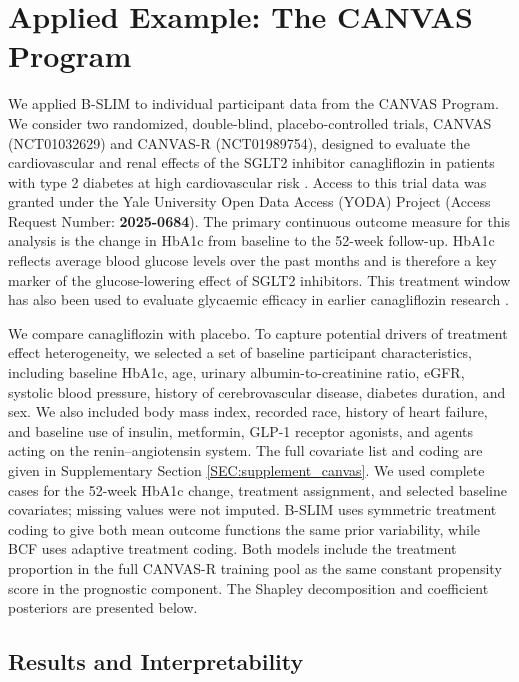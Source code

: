 \documentclass[12pt]{article}
\begin{document}
\section{Applied Example: The CANVAS Program}
\label{subsec:applied_example}
We applied B-SLIM to individual participant data from the CANVAS Program. We consider two randomized, double-blind, placebo-controlled trials, CANVAS (NCT01032629) and CANVAS-R (NCT01989754), designed to evaluate the cardiovascular and renal effects of the SGLT2 inhibitor canagliflozin in patients with type 2 diabetes at high cardiovascular risk \citep{neal2013rationale, neal2017rationale}. Access to this trial data was granted under the Yale University Open Data Access (YODA) Project (Access Request Number: \textbf{2025-0684}). The primary continuous outcome measure for this analysis is the change in HbA1c from baseline to the 52-week follow-up. HbA1c reflects average blood glucose levels over the past months and is therefore a key marker of the glucose-lowering effect of SGLT2 inhibitors. This treatment window has also been used to evaluate glycaemic efficacy in earlier canagliflozin research \citep{cefalu2013efficacy}.

We compare canagliflozin with placebo. To capture potential drivers of treatment effect heterogeneity, we selected a set of baseline participant characteristics, including baseline HbA1c, age, urinary albumin-to-creatinine ratio, eGFR, systolic blood pressure, history of cerebrovascular disease, diabetes duration, and sex. We also included body mass index, recorded race, history of heart failure, and baseline use of insulin, metformin, GLP-1 receptor agonists, and agents acting on the renin--angiotensin system. The full covariate list and coding are given in Supplementary Section \ref{SEC:supplement_canvas}. We used complete cases for the 52-week HbA1c change, treatment assignment, and selected baseline covariates; missing values were not imputed. B-SLIM uses symmetric treatment coding to give both mean outcome functions the same prior variability, while BCF uses adaptive treatment coding. Both models include the treatment proportion in the full CANVAS-R training pool as the same constant propensity score in the prognostic component. The Shapley decomposition and coefficient posteriors are presented below.

\subsection{Results and Interpretability}
\label{subsec:oos_performance_summary}
\end{document}

